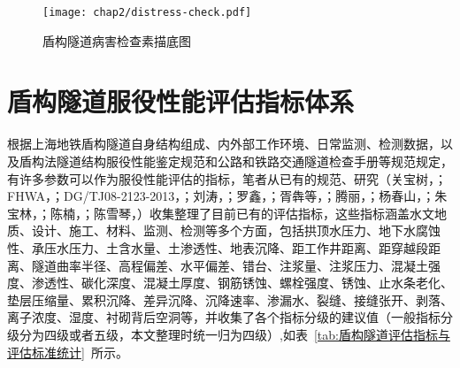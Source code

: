 \begin{figure}[htbp]
    \centering
    \texttt{[image: chap2/distress-check.pdf]}
    \caption{盾构隧道病害检查素描底图}
    \label{fig:盾构隧道病害检查素描底图}
\end{figure}

\section{盾构隧道服役性能评估指标体系}

根据上海地铁盾构隧道自身结构组成、内外部工作环境、日常监测、检测数据，以及盾构法隧道结构服役性能鉴定规范和公路和铁路交通隧道检查手册等规范规定，有许多参数可以作为服役性能评估的指标，笔者从已有的规范、研究（关宝树，\citeyear{关宝树1993日本铁路隧道维修养护管理技术的现状}；FHWA，\citeyear{FHWA2005Highway}；DG/TJ08-2123-2013，\citeyear{DGTJ0821232013}；刘涛，\citeyear{刘涛2008既有盾构隧道结构性能评价研究}；罗鑫，\citeyear{罗鑫2008公路隧道健康状态评估方法及系统研究}；胥犇等，\citeyear{胥犇2010盾构隧道结构病害状态综合评价方法研究}；腾丽，\citeyear{滕丽2012基于土体力学特性的盾构隧道施工风险监控系统研究}；杨春山，\citeyear{杨春山2012运营地铁盾构隧道衬砌结构安全评估体系研究}；朱宝林，\citeyear{朱宝林2014运营地铁盾构隧道状态评估及预测方法研究}；陈楠，\citeyear{陈楠2017考虑发展趋势与指标关联的隧道结构健康评估方法研究}；陈雪琴，\citeyear{陈雪琴2017交通基础设施服役性能评估和预测以及养护时机优化分析}）收集整理了目前已有的评估指标，这些指标涵盖水文地质、设计、施工、材料、监测、检测等多个方面，包括拱顶水压力、地下水腐蚀性、承压水压力、土含水量、土渗透性、地表沉降、距工作井距离、距穿越段距离、隧道曲率半径、高程偏差、水平偏差、错台、注浆量、注浆压力、混凝土强度、渗透性、碳化深度、混凝土厚度、钢筋锈蚀、螺栓强度、锈蚀、止水条老化、垫层压缩量、累积沉降、差异沉降、沉降速率、渗漏水、裂缝、接缝张开、剥落、离子浓度、湿度、衬砌背后空洞等，并收集了各个指标分级的建议值（一般指标分级分为四级或者五级，本文整理时统一归为四级）,如表~\ref{tab:盾构隧道评估指标与评估标准统计}~所示。

